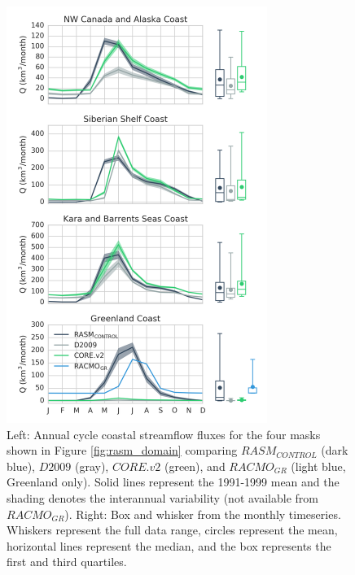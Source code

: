 \documentclass[jgrga, draft]{agutex}
\begin{document}
\clearpage
\begin{figure}
\noindent\includegraphics[width=20pc,natwidth=1]{coastal_hydrographs}
\caption{Left: Annual cycle coastal streamflow fluxes for the four masks shown in Figure \ref{fig:rasm_domain} comparing $RASM_{CONTROL}$ (dark blue), $D2009$ (gray), $CORE.v2$ (green), and $RACMO_{GR}$ (light blue, Greenland only).
Solid lines represent the 1991-1999 mean and the shading denotes the interannual variability (not available from $RACMO_{GR}$).
Right: Box and whisker from the monthly timeseries.
Whiskers represent the full data range, circles represent the mean, horizontal lines represent the median, and the box represents the first and third quartiles.
}
\label{fig:coastal_hydrographs}
\end{figure}
\end{document}
